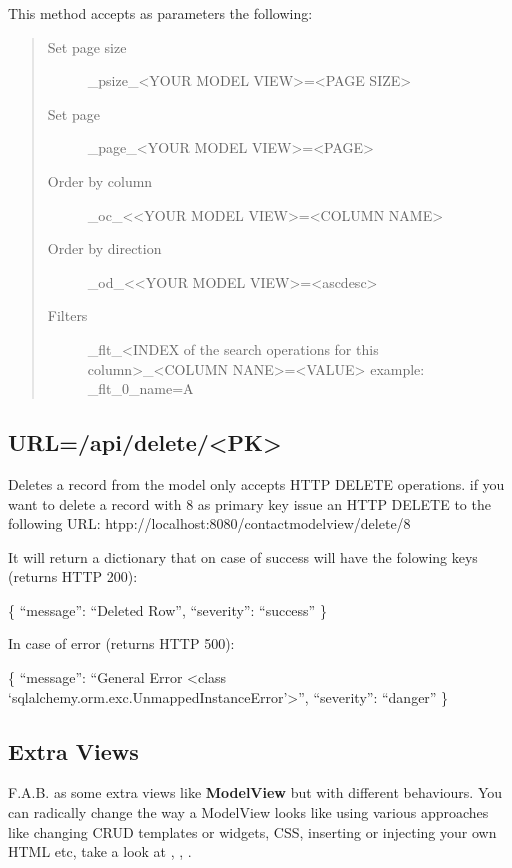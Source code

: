 \documentclass[letterpaper,10pt,english]{sphinxmanual}
\begin{document}
This method accepts as parameters the following:
\begin{quote}\begin{description}
\item[{Set page size}] \leavevmode
\_psize\_\textless{}YOUR MODEL VIEW\textgreater{}=\textless{}PAGE SIZE\textgreater{}

\item[{Set page}] \leavevmode
\_page\_\textless{}YOUR MODEL VIEW\textgreater{}=\textless{}PAGE\textgreater{}

\item[{Order by column}] \leavevmode
\_oc\_\textless{}\textless{}YOUR MODEL VIEW\textgreater{}=\textless{}COLUMN NAME\textgreater{}

\item[{Order by direction}] \leavevmode
\_od\_\textless{}\textless{}YOUR MODEL VIEW\textgreater{}=\textless{}asc\textbar{}desc\textgreater{}

\item[{Filters}] \leavevmode
\_flt\_\textless{}INDEX of the search operations for this column\textgreater{}\_\textless{}COLUMN NANE\textgreater{}=\textless{}VALUE\textgreater{} example: \_flt\_0\_name=A

\end{description}\end{quote}


\subsection{URL=/api/delete/\textless{}PK\textgreater{}}
\label{quickhowto:url-api-delete-pk}
Deletes a record from the model only accepts HTTP DELETE operations. if you want to delete a record with 8 as primary
key issue an HTTP DELETE to the following URL: htpp://localhost:8080/contactmodelview/delete/8

It will return a dictionary that on case of success will have the folowing keys (returns HTTP 200):

\{
``message'': ``Deleted Row'',
``severity'': ``success''
\}

In case of error (returns HTTP 500):

\{
``message'': ``General Error \textless{}class `sqlalchemy.orm.exc.UnmappedInstanceError'\textgreater{}'',
``severity'': ``danger''
\}


\subsection{Extra Views}
\label{quickhowto:extra-views}
F.A.B. as some extra views like \textbf{ModelView} but with different behaviours. You can radically change the way a ModelView
looks like using various approaches like changing CRUD templates or widgets, CSS, inserting or injecting your own
HTML etc, take a look at {\hyperref[templates::doc]{}}, {\hyperref[advanced::doc]{}}, {\hyperref[customizing::doc]{}}.
\end{document}
